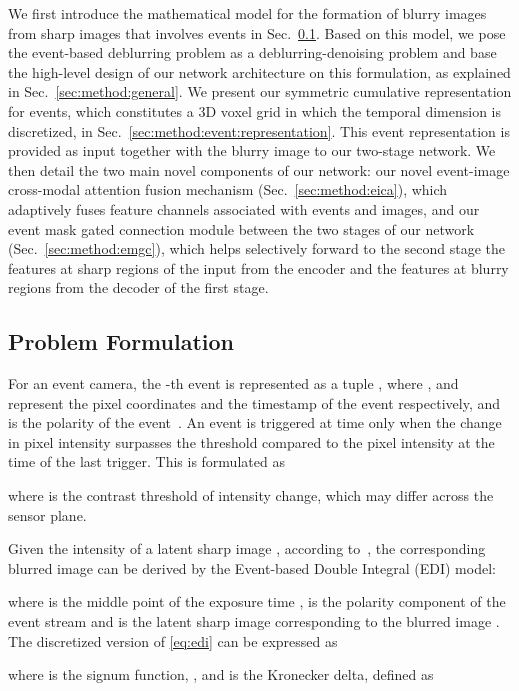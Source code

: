 \documentclass[runningheads]{llncs}
\newlength \g
\begin{document}
We first introduce the mathematical model for the formation of blurry images from sharp images that involves events in Sec.~\ref{sec:method:theory}. Based on this model, we pose the event-based deblurring problem as a deblurring-denoising problem and base the high-level design of our network architecture on this formulation, as explained in Sec.~\ref{sec:method:general}. We present our symmetric cumulative representation for events, which constitutes a 3D voxel grid in which the temporal dimension is discretized, in Sec.~\ref{sec:method:event:representation}. This event representation is provided as input together with the blurry image to our two-stage network. We then detail the two main novel components of our network: our novel event-image cross-modal attention fusion mechanism (Sec.~\ref{sec:method:eica}), which adaptively fuses feature channels associated with events and images, and our event mask gated connection module between the two stages of our network (Sec.~\ref{sec:method:emgc}), which helps selectively forward to the second stage the features at sharp regions of the input from the encoder and the features at blurry regions from the decoder of the first stage.

\subsection{Problem Formulation}
\label{sec:method:theory}


For an event camera, the -th event  is represented as a tuple , where ,  and  represent the pixel coordinates and the timestamp of the event respectively, and  is the polarity of the event~\cite{brandli2014240,patrick2008128x}. An event is triggered at time  only when the change in pixel intensity  surpasses the threshold compared to the pixel intensity at the time of the last trigger. This is formulated as 

where  is the contrast threshold of intensity change, which may differ across the sensor plane.

Given the intensity of a latent sharp image , according to~\cite{pan2019bringing_high_framerate}, the corresponding blurred image  can be derived by the Event-based Double Integral (EDI) model:
{\small

}where  is the middle point of the exposure time ,  is the polarity component of the event stream and  is the latent sharp image corresponding to the blurred image . The discretized version of \eqref{eq:edi} can be expressed as
{\small

}where  is the signum function, ,  and  is the Kronecker delta, defined as
\end{document}
